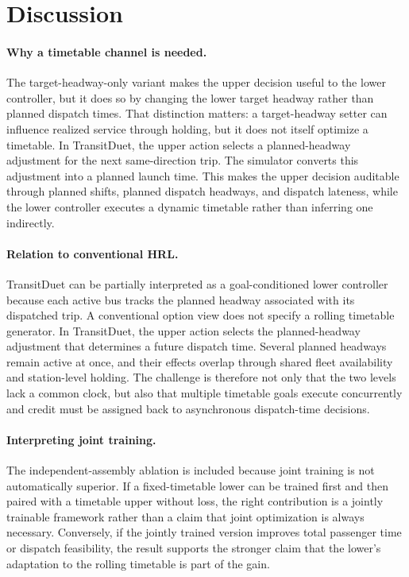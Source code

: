 \section{Discussion}
\label{sec:discussion}

\paragraph{Why a timetable channel is needed.}
The target-headway-only variant makes the upper decision useful to the lower controller, but it does so by changing the lower target headway rather than planned dispatch times. That distinction matters: a target-headway setter can influence realized service through holding, but it does not itself optimize a timetable. In TransitDuet, the upper action selects a planned-headway adjustment for the next same-direction trip. The simulator converts this adjustment into a planned launch time. This makes the upper decision auditable through planned shifts, planned dispatch headways, and dispatch lateness, while the lower controller executes a dynamic timetable rather than inferring one indirectly.

\paragraph{Relation to conventional HRL.}
TransitDuet can be partially interpreted as a goal-conditioned lower controller because each active bus tracks the planned headway associated with its dispatched trip. A conventional option view does not specify a rolling timetable generator. In TransitDuet, the upper action selects the planned-headway adjustment that determines a future dispatch time. Several planned headways remain active at once, and their effects overlap through shared fleet availability and station-level holding. The challenge is therefore not only that the two levels lack a common clock, but also that multiple timetable goals execute concurrently and credit must be assigned back to asynchronous dispatch-time decisions.

\paragraph{Interpreting joint training.}
The independent-assembly ablation is included because joint training is not automatically superior. If a fixed-timetable lower can be trained first and then paired with a timetable upper without loss, the right contribution is a jointly trainable framework rather than a claim that joint optimization is always necessary. Conversely, if the jointly trained version improves total passenger time or dispatch feasibility, the result supports the stronger claim that the lower's adaptation to the rolling timetable is part of the gain.

